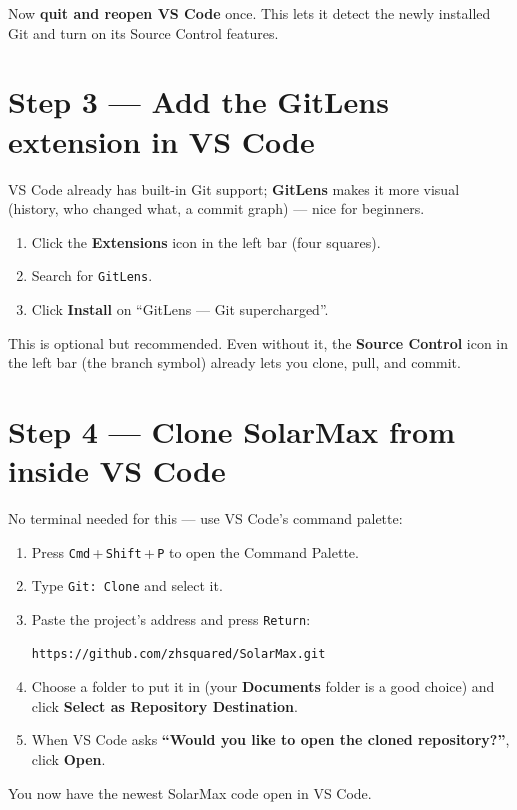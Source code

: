 \documentclass[11pt]{article}
\begin{document}
\begin{tip}
Now \textbf{quit and reopen VS Code} once. This lets it detect the newly installed
Git and turn on its Source Control features.
\end{tip}

\section{Step 3 --- Add the GitLens extension in VS Code}
VS Code already has built-in Git support; \textbf{GitLens} makes it more visual (history,
who changed what, a commit graph) --- nice for beginners.
\begin{enumerate}
  \item Click the \textbf{Extensions} icon in the left bar (four squares).
  \item Search for \texttt{GitLens}.
  \item Click \textbf{Install} on ``GitLens --- Git supercharged''.
\end{enumerate}

\begin{note}
This is optional but recommended. Even without it, the \textbf{Source Control} icon in
the left bar (the branch symbol) already lets you clone, pull, and commit.
\end{note}

\section{Step 4 --- Clone SolarMax from inside VS Code}
No terminal needed for this --- use VS Code's command palette:
\begin{enumerate}
  \item Press \texttt{Cmd}\,+\,\texttt{Shift}\,+\,\texttt{P} to open the Command Palette.
  \item Type \texttt{Git: Clone} and select it.
  \item Paste the project's address and press \texttt{Return}:
\begin{lstlisting}
https://github.com/zhsquared/SolarMax.git
\end{lstlisting}
  \item Choose a folder to put it in (your \textbf{Documents} folder is a good choice)
        and click \textbf{Select as Repository Destination}.
  \item When VS Code asks \textbf{``Would you like to open the cloned repository?''},
        click \textbf{Open}.
\end{enumerate}
You now have the newest SolarMax code open in VS Code.
\end{document}
